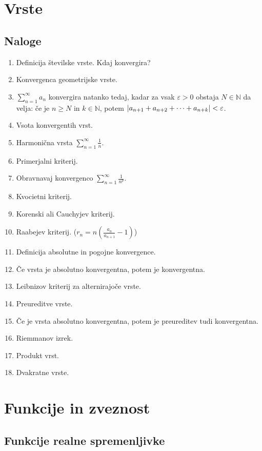 \documentclass[a4paper,12pt]{report}
\begin{document}
\chapter{Vrste}

\section*{Naloge}

\begin{enumerate}
    \item Definicija številske vrste. Kdaj konvergira?
    \item Konvergenca geometrijske vrste.
    \item $\sum_{n=1}^{\infty}a_n$ konvergira natanko tedaj, kadar za vsak $\varepsilon > 0$ obstaja $N \in \mathbb{N}$ da velja:
            če je $n \geq N$ in $k \in \mathbb{N}$, potem $\abs{a_{n+1} + a_{n+2} + \dots + a_{n+k}} < \varepsilon$.
    \item Vsota konvergentih vrst.
    \item Harmonična vrsta $\sum_{n=1}^{\infty} \frac{1}{n}$.
    \item Primerjalni kriterij.
    \item Obravnavaj konvergenco $\sum_{n=1}^{\infty} \frac{1}{n^p}$.
    \item Kvocietni kriterij.
    \item Korenski ali Cauchyjev kriterij.
    \item Raabejev kriterij. ($r_n = n (\frac{a_n}{a_{n+1}} - 1)$)
    \item Definicija absolutne in pogojne konvergence.
    \item Če vrsta je absolutno konvergentna, potem je konvergentna.
    \item Leibnizov kriterij za alternirajoče vrste.
    \item Preureditve vrste.
    \item Če je vrsta absolutno konvergentna, potem je preureditev tudi konvergentna.
    \item Riemmanov izrek.
    \item Produkt vrst.
    \item Dvakratne vrste.
\end{enumerate}


\chapter{Funkcije in zveznost}

\section*{Funkcije realne spremenljivke}
\end{document}
